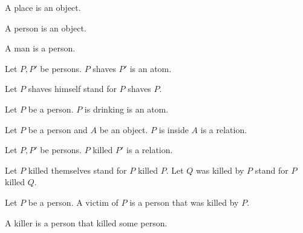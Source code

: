 
\begin{forthel}
\end{forthel}



\begin{forthel}
  \begin{signature*}
    A place is an object.
  \end{signature*}
\end{forthel}



\begin{forthel}
  \begin{signature*}
    A person is an object.
  \end{signature*}

  \begin{signature*}
    A man is a person.
  \end{signature*}

  \begin{signature*}
    Let $P, P'$ be persons.
    $P$ shaves $P'$ is an atom.
  \end{signature*}

  Let $P$ shaves himself stand for $P$ shaves $P$.


  \begin{signature*}
    Let $P$ be a person.
    $P$ is drinking is an atom.
  \end{signature*}

  \begin{signature*}
    Let $P$ be a person and $A$ be an object.
    $P$ is inside $A$ is a relation.
  \end{signature*}

  \begin{signature*}
    Let $P, P'$ be persons.
    $P$ killed $P'$ is a relation.
  \end{signature*}

  Let $P$ killed themselves stand for $P$ killed $P$.
  Let $Q$ was killed by $P$ stand for $P$ killed $Q$.

  \begin{definition*}
    Let $P$ be a person.
    A victim of $P$ is a person that was killed by $P$.
  \end{definition*}

  \begin{definition*}
    A killer is a person that killed some person.
  \end{definition*}


\end{forthel}
